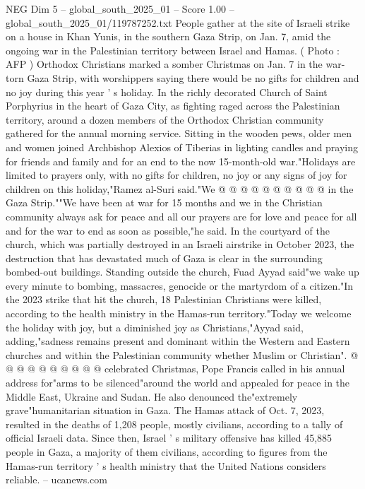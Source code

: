 \begin{textsample}{NEG Dim 5 – global\_south\_2025\_01 – Score 1.00 – global\_south\_2025\_01/119787252.txt}  \label{ex:f5_neg_159}
People gather at the site of Israeli strike on a house in Khan Yunis, in the southern Gaza Strip, on Jan. 7, amid the ongoing war in the Palestinian territory between Israel and Hamas. ( Photo : AFP ) Orthodox Christians marked a somber Christmas on Jan. 7 in the war-torn Gaza Strip, with worshippers saying there would be no gifts for children and no joy during this year ' s holiday.
In the richly decorated Church of Saint Porphyrius in the heart of Gaza City, as fighting raged across the Palestinian territory, around a dozen members of the Orthodox Christian community gathered for the annual morning service.
Sitting in the wooden pews, older men and women joined Archbishop Alexios of Tiberias in lighting candles and praying for friends and family and for an end to the now 15-month-old war."Holidays are limited to prayers only, with no gifts for children, no joy or any signs of joy for children on this holiday,"Ramez al-Suri said."We @ @ @ @ @ @ @ @ @ @ in the Gaza Strip.""We have been at war for 15 months and we in the Christian community always ask for peace and all our prayers are for love and peace for all and for the war to end as soon as possible,"he said.
In the courtyard of the church, which was partially destroyed in an Israeli airstrike in October 2023, the destruction that has devastated much of Gaza is clear in the surrounding bombed-out buildings.
Standing outside the church, Fuad Ayyad said"we wake up every minute to bombing, massacres, genocide or the martyrdom of a citizen."In the 2023 strike that hit the church, 18 Palestinian Christians were killed, according to the health ministry in the Hamas-run territory."Today we welcome the holiday with joy, but a diminished joy as Christians,"Ayyad said, adding,"sadness remains present and dominant within the Western and Eastern churches and within the Palestinian community whether Muslim or Christian". @ @ @ @ @ @ @ @ @ @ celebrated Christmas, Pope Francis called in his annual address for"arms to be silenced"around the world and appealed for peace in the Middle East, Ukraine and Sudan.
He also denounced the"extremely grave"humanitarian situation in Gaza.
The Hamas attack of Oct. 7, 2023, resulted in the deaths of 1,208 people, mostly civilians, according to a tally of official Israeli data.
Since then, Israel ' s military offensive has killed 45,885 people in Gaza, a majority of them civilians, according to figures from the Hamas-run territory ' s health ministry that the United Nations considers reliable. -- ucanews.com

\end{textsample}
